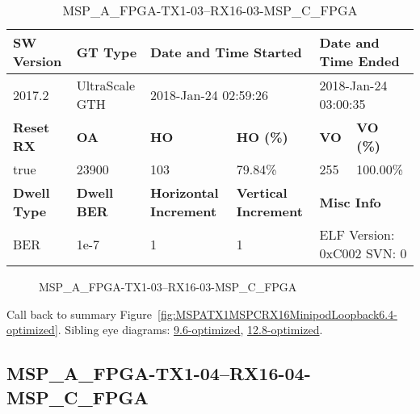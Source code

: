 \begin{table}[h]
\centering
\caption{MSP\_A\_FPGA-TX1-03--RX16-03-MSP\_C\_FPGA}
\label{tab:MSPAFPGATX103RX1603MSPCFPGA6.4-optimized}
\begin{tabular}{@{}|l|l|l|l|l|l|@{}}
\toprule
\textbf{SW Version}                & \textbf{GT Type}   & \multicolumn{2}{l|}{\textbf{Date and Time Started}}            & \multicolumn{2}{l|}{\textbf{Date and Time Ended}}        \\ \midrule
2017.2                       & UltraScale GTH          & \multicolumn{2}{l|}{2018-Jan-24 02:59:26}                   & \multicolumn{2}{l|}{2018-Jan-24 03:00:35}               \\ \midrule
\textbf{Reset RX}                  & \textbf{OA} & \textbf{HO}   & \textbf{HO (\%)} & \textbf{VO} & \textbf{VO (\%)} \\ \midrule
true & 23900        & 103          & 79.84\%        & 255        & 100.00\%       \\ \midrule
\textbf{Dwell Type}                & \textbf{Dwell BER} & \textbf{Horizontal Increment} & \textbf{Vertical Increment}    & \multicolumn{2}{l|}{\textbf{Misc Info}}                  \\ \midrule
BER                            & 1e-7        & 1        & 1           & \multicolumn{2}{l|}{ELF Version: 0xC002 SVN: 0}                         \\ \bottomrule
\end{tabular}
\end{table}

\begin{figure}[h]
\caption{MSP\_A\_FPGA-TX1-03--RX16-03-MSP\_C\_FPGA} \label{fig:MSPAFPGATX103RX1603MSPCFPGA6.4-optimized}
\end{figure}

Call back to summary Figure~\ref{fig:MSPATX1MSPCRX16MinipodLoopback6.4-optimized}.
Sibling eye diagrams: \hyperref[sec:MSPAFPGATX103RX1603MSPCFPGA9.6-optimized]{9.6-optimized}, \hyperref[sec:MSPAFPGATX103RX1603MSPCFPGA12.8-optimized]{12.8-optimized}.

\clearpage
\newpage


\subsection{MSP\_A\_FPGA-TX1-04--RX16-04-MSP\_C\_FPGA}\label{sec:MSPAFPGATX104RX1604MSPCFPGA6.4-optimized}

